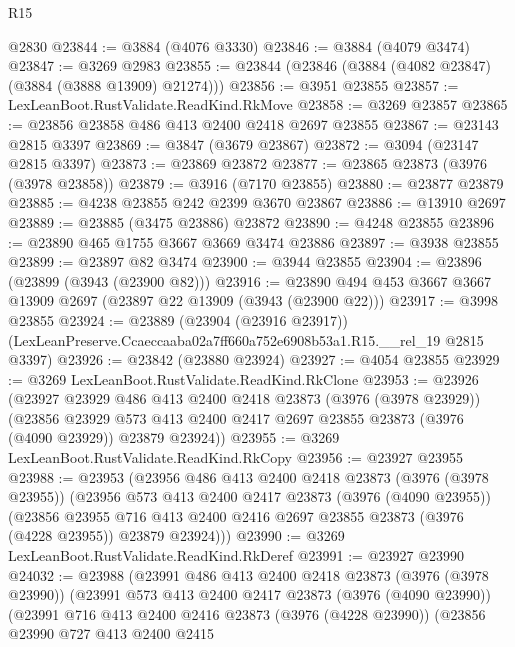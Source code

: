 \begin{lexlean}{R15}
\begin{coremodule}
    @2830
@23844 := @3884 (@4076 @3330)
@23846 := @3884 (@4079 @3474)
@23847 := @3269 @2983
@23855 := @23844 (@23846 (@3884 (@4082 @23847) (@3884 (@3888 @13909) @21274)))
@23856 := @3951 @23855
@23857 := LexLeanBoot.RustValidate.ReadKind.RkMove
@23858 := @3269 @23857
@23865 := @23856 @23858 @486 @413 @2400 @2418 @2697 @23855
@23867 := @23143 @2815 @3397
@23869 := @3847 (@3679 @23867)
@23872 := @3094 (@23147 @2815 @3397)
@23873 := @23869 @23872
@23877 := @23865 @23873 (@3976 (@3978 @23858))
@23879 := @3916 (@7170 @23855)
@23880 := @23877 @23879
@23885 := @4238 @23855 @242 @2399 @3670 @23867
@23886 := @13910 @2697
@23889 := @23885 (@3475 @23886) @23872
@23890 := @4248 @23855
@23896 := @23890 @465 @1755 @3667 @3669 @3474 @23886
@23897 := @3938 @23855
@23899 := @23897 @82 @3474
@23900 := @3944 @23855
@23904 := @23896 (@23899 (@3943 (@23900 @82)))
@23916 := @23890 @494 @453 @3667 @3667 @13909 @2697 (@23897 @22 @13909 (@3943 (@23900 @22)))
@23917 := @3998 @23855
@23924 := @23889
    (@23904 (@23916 @23917))
    (LexLeanPreserve.Ccaeccaaba02a7ff660a752e6908b53a1.R15.__rel_19 @2815 @3397)
@23926 := @23842 (@23880 @23924)
@23927 := @4054 @23855
@23929 := @3269 LexLeanBoot.RustValidate.ReadKind.RkClone
@23953 := @23926
    (@23927
      @23929
      @486
      @413
      @2400
      @2418
      @23873
      (@3976 (@3978 @23929))
      (@23856
        @23929
        @573
        @413
        @2400
        @2417
        @2697
        @23855
        @23873
        (@3976 (@4090 @23929))
        @23879
        @23924))
@23955 := @3269 LexLeanBoot.RustValidate.ReadKind.RkCopy
@23956 := @23927 @23955
@23988 := @23953
    (@23956
      @486
      @413
      @2400
      @2418
      @23873
      (@3976 (@3978 @23955))
      (@23956
        @573
        @413
        @2400
        @2417
        @23873
        (@3976 (@4090 @23955))
        (@23856
          @23955
          @716
          @413
          @2400
          @2416
          @2697
          @23855
          @23873
          (@3976 (@4228 @23955))
          @23879
          @23924)))
@23990 := @3269 LexLeanBoot.RustValidate.ReadKind.RkDeref
@23991 := @23927 @23990
@24032 := @23988
    (@23991
      @486
      @413
      @2400
      @2418
      @23873
      (@3976 (@3978 @23990))
      (@23991
        @573
        @413
        @2400
        @2417
        @23873
        (@3976 (@4090 @23990))
        (@23991
          @716
          @413
          @2400
          @2416
          @23873
          (@3976 (@4228 @23990))
          (@23856
            @23990
            @727
            @413
            @2400
            @2415

\end{coremodule}
\end{lexlean}
